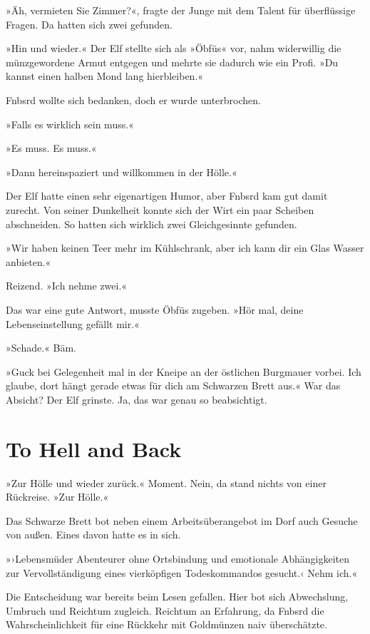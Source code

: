 »Äh, vermieten Sie Zimmer?«, fragte der Junge mit dem Talent für überflüssige Fragen. Da hatten sich zwei gefunden.

»Hin und wieder.« Der Elf stellte sich als »Öbfüs« vor, nahm widerwillig die münzgewordene Armut entgegen und mehrte sie dadurch wie ein Profi. »Du kannst einen halben Mond lang hierbleiben.«

Fnbsrd wollte sich bedanken, doch er wurde unterbrochen.

»Falls es wirklich sein muss.«

 »Es muss. Es muss.«

»Dann hereinspaziert und willkommen in der Hölle.«

Der Elf hatte einen sehr eigenartigen Humor, aber Fnbsrd kam gut damit zurecht. Von seiner Dunkelheit konnte sich der Wirt ein paar Scheiben abschneiden. So hatten sich wirklich zwei Gleichgesinnte gefunden.

»Wir haben keinen Teer mehr im Kühlschrank, aber ich kann dir ein Glas Wasser anbieten.«

Reizend. »Ich nehme zwei.«

Das war eine gute Antwort, musste Öbfüs zugeben. »Hör mal, deine Lebenseinstellung gefällt mir.«

»Schade.« Bäm.

»Guck bei Gelegenheit mal in der Kneipe an der östlichen Burgmauer vorbei. Ich glaube, dort hängt gerade etwas für dich am Schwarzen Brett aus.« War das Absicht? Der Elf grinste. Ja, das war genau so beabsichtigt.


\chapter{To Hell and Back}

»Zur Hölle und wieder zurück.« Moment. Nein, da stand nichts von einer Rückreise. »Zur Hölle.«

Das Schwarze Brett bot neben einem Arbeitsüberangebot im Dorf auch Gesuche von außen. Eines davon hatte es in sich.

»›Lebensmüder Abenteurer ohne Ortsbindung und emotionale Abhängigkeiten zur Vervollständigung eines vierköpfigen Todeskommandos gesucht.‹ Nehm ich.«

Die Entscheidung war bereits beim Lesen gefallen. Hier bot sich Abwechslung, Umbruch und Reichtum zugleich. Reichtum an Erfahrung, da Fnbsrd die Wahrscheinlichkeit für eine Rückkehr mit Goldmünzen naiv überschätzte.

